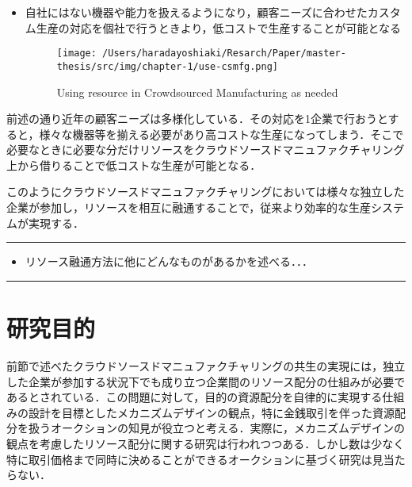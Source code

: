 \begin{itemize}
\item
  自社にはない機器や能力を扱えるようになり，顧客ニーズに合わせたカスタム生産の対応を個社で行うときより，低コストで生産することが可能となる

  \begin{figure}[H]
  \hypertarget{fig:use-csmfg}{%
  \centering
  \texttt{[image: /Users/haradayoshiaki/Resarch/Paper/master-thesis/src/img/chapter-1/use-csmfg.png]}
  \caption{Using resource in Crowdsourced Manufacturing as
  needed}\label{fig:use-csmfg}
  }
  \end{figure}
\end{itemize}

前述の通り近年の顧客ニーズは多様化している．その対応を1企業で行おうとすると，様々な機器等を揃える必要があり高コストな生産になってしまう．そこで必要なときに必要な分だけリソースをクラウドソースドマニュファクチャリング上から借りることで低コストな生産が可能となる．

このようにクラウドソースドマニュファクチャリングにおいては様々な独立した企業が参加し，リソースを相互に融通することで，従来より効率的な生産システムが実現する．

\begin{center}\rule{1.0\linewidth}{0.5pt}\end{center}

\begin{itemize}
\tightlist
\item
  リソース融通方法に他にどんなものがあるかを述べる．．．
\end{itemize}

\begin{center}\rule{1.0\linewidth}{0.5pt}\end{center}

\hypertarget{ux7814ux7a76ux76eeux7684}{%
\section{研究目的}\label{ux7814ux7a76ux76eeux7684}}

前節で述べたクラウドソースドマニュファクチャリングの共生の実現には，独立した企業が参加する状況下でも成り立つ企業間のリソース配分の仕組みが必要であるとされている\cite{Ghomi2019}．この問題に対して，目的の資源配分を自律的に実現する仕組みの設計を目標としたメカニズムデザインの観点，特に金銭取引を伴った資源配分を扱うオークションの知見が役立つと考える．実際に，メカニズムデザインの観点を考慮したリソース配分に関する研究は行われつつある\cite{THEKINEN2017}\cite{CHIDA2019}．しかし数は少なく特に取引価格まで同時に決めることができるオークションに基づく研究は見当たらない．

